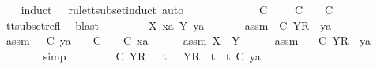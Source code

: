 \ \ \isamarkupfalse%
\ {\isacharparenleft}induct\ {\isasymrho}\ {\isasymsigma}\ rule{\isacharcolon}tt{\isacharunderscore}subset{\isachardot}induct{\isacharcomma}\ auto{\isacharparenright}\isanewline
\ \ \ \ \isamarkupfalse%
\ {\isasymsigma}{\isacharprime}\isanewline
\ \ \ \ \isamarkupfalse%
\ {\isachardoublequoteopen}{\isasymsigma}{\isacharprime}\ {\isasymle}\isactrlsub C\ {\isacharbrackleft}{\isacharbrackright}\ {\isasymLongrightarrow}\ {\isasymexists}{\isasymrho}{\isacharprime}{\isachardot}\ {\isasymrho}{\isacharprime}\ {\isasymsubseteq}\isactrlsub C\ {\isasymsigma}{\isacharprime}\ {\isasymand}\ {\isasymrho}{\isacharprime}\ {\isasymle}\isactrlsub C\ {\isacharbrackleft}{\isacharbrackright}{\isachardoublequoteclose}\isanewline
\ \ \ \ \ \ \isamarkupfalse%
\ tt{\isacharunderscore}subset{\isacharunderscore}refl\ \isamarkupfalse%
\ blast\isanewline
\ \ \isamarkupfalse%
\isanewline
\ \ \ \ \isamarkupfalse%
\ X\ xa\ Y\ ya\ {\isasymsigma}{\isacharprime}\isanewline
\ \ \ \ \isamarkupfalse%
\ assm{}{\isacharcolon}\ {\isachardoublequoteopen}{\isasymsigma}{\isacharprime}\ {\isasymle}\isactrlsub C\ {\isacharbrackleft}Y{\isacharbrackright}\isactrlsub R\ {\isacharhash}\ ya{\isachardoublequoteclose}\isanewline
\ \ \ \ \isamarkupfalse%
\ assm{}{\isacharcolon}\ {\isachardoublequoteopen}{\isacharparenleft}{\isasymAnd}{\isasymsigma}{\isacharprime}{\isachardot}\ {\isasymsigma}{\isacharprime}\ {\isasymle}\isactrlsub C\ ya\ {\isasymLongrightarrow}\ {\isasymexists}{\isasymrho}{\isacharprime}{\isachardot}\ {\isasymrho}{\isacharprime}\ {\isasymsubseteq}\isactrlsub C\ {\isasymsigma}{\isacharprime}\ {\isasymand}\ {\isasymrho}{\isacharprime}\ {\isasymle}\isactrlsub C\ xa{\isacharparenright}{\isachardoublequoteclose}\isanewline
\ \ \ \ \isamarkupfalse%
\ assm{}{\isacharcolon}\ {\isachardoublequoteopen}X\ {\isasymsubseteq}\ Y{\isachardoublequoteclose}\isanewline
\ \ \ \ \isamarkupfalse%
\ assm{}\ \isamarkupfalse%
\ {\isachardoublequoteopen}{\isasymsigma}{\isacharprime}\ {\isasymle}\isactrlsub C\ {\isacharbrackleft}{\isacharbrackleft}Y{\isacharbrackright}\isactrlsub R{\isacharbrackright}\ {\isacharat}\ ya{\isachardoublequoteclose}\isanewline
\ \ \ \ \ \ \isamarkupfalse%
\ simp\isanewline
\ \ \ \ \isamarkupfalse%
\ \isamarkupfalse%
\ {\isachardoublequoteopen}{\isasymsigma}{\isacharprime}\ {\isasymle}\isactrlsub C\ {\isacharbrackleft}{\isacharbrackleft}Y{\isacharbrackright}\isactrlsub R{\isacharbrackright}\ \ {\isasymor}\ {\isacharparenleft}{\isasymexists}t{\isacharprime}{\isachardot}\ {\isasymsigma}{\isacharprime}\ {\isacharequal}\ {\isacharbrackleft}{\isacharbrackleft}Y{\isacharbrackright}\isactrlsub R{\isacharbrackright}\ {\isacharat}\ t{\isacharprime}\ {\isasymand}\ t{\isacharprime}\ {\isasymle}\isactrlsub C\ ya{\isacharparenright}{\isachardoublequoteclose}\isanewline
